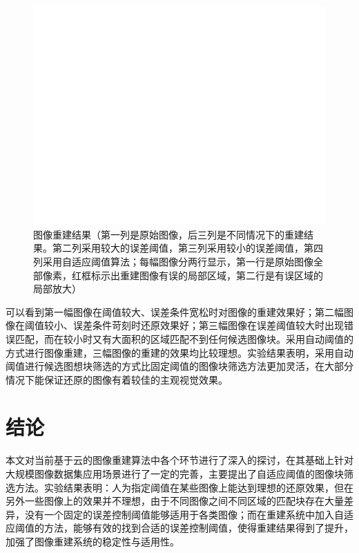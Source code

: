 \documentclass[UTF8]{csoarticle}
\begin{document}
\begin{figure}
\centering\includegraphics[width=15cm]{rec_result}
\caption{图像重建结果（第一列是原始图像，后三列是不同情况下的重建结果。第二列采用较大的误差阈值，第三列采用较小的误差阈值，第四列采用自适应阈值算法；每幅图像分两行显示，第一行是原始图像全部像素，红框标示出重建图像有误的局部区域，第二行是有误区域的局部放大）}
\label{fig:result}
\end{figure}

可以看到第一幅图像在阈值较大、误差条件宽松时对图像的重建效果好；第二幅图像在阈值较小、误差条件苛刻时还原效果好；第三幅图像在误差阈值较大时出现错误匹配，而在较小时又有大面积的区域匹配不到任何候选图像块。采用自动阈值的方式进行图像重建，三幅图像的重建的效果均比较理想。实验结果表明，采用自动阈值进行候选图想块筛选的方式比固定阈值的图像块筛选方法更加灵活，在大部分情况下能保证还原的图像有着较佳的主观视觉效果。

\section{结论}

本文对当前基于云的图像重建算法中各个环节进行了深入的探讨，在其基础上针对大规模图像数据集应用场景进行了一定的完善，主要提出了自适应阈值的图像块筛选方法。实验结果表明：人为指定阈值在某些图像上能达到理想的还原效果，但在另外一些图像上的效果并不理想，由于不同图像之间不同区域的匹配块存在大量差异，没有一个固定的误差控制阈值能够适用于各类图像；而在重建系统中加入自适应阈值的方法，能够有效的找到合适的误差控制阈值，使得重建结果得到了提升，加强了图像重建系统的稳定性与适用性。
\end{document}
